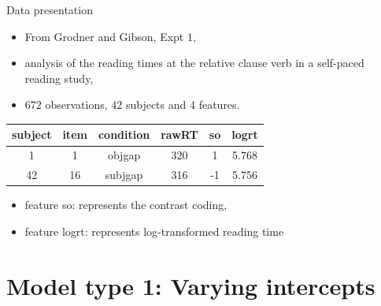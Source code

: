 \documentclass[unknownkeysallowed]{beamer}
\begin{document}
\begin{frame}{Data presentation}
\begin{itemize}
    \item From Grodner and Gibson, Expt $1$,
    \item analysis of the reading times at the relative clause verb in a self-paced reading study,
    \item $672$ observations, $42$ subjects and $4$ features.
\end{itemize}
\begin{center}
    \begin{tabular}{|c|c|c|c|c|c|}
    \hline
         subject & item & condition & rawRT & so & logrt  \\
         \hline \hline
         1 & 1 & objgap & 320 & 1 & 5.768\\
         42 & 16 & subjgap & 316 & -1 & 5.756\\
         \hline
    \end{tabular}
\end{center}
\begin{itemize}
    \item feature so: represents the contrast coding,
    \item feature logrt: represents log-transformed reading time
\end{itemize}
\end{frame}

\section{Model type 1: Varying intercepts}
\end{document}
